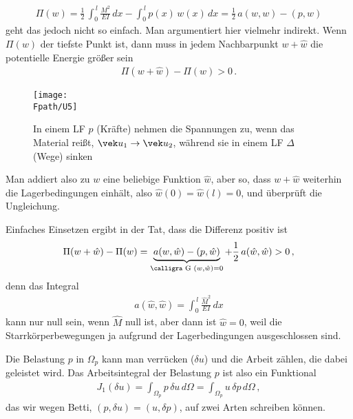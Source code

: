 {{{{{{\begin{align}
\Pi(w) =\frac{1}{2}\, \int_0^{\,l} \frac{M^2}{EI}\,dx - \int_0^{\,l} p(x)\,w(x)\,dx = \frac{1}{2}\, a(w,w) - (p,w)
\end{align}
 geht das jedoch nicht so einfach. Man argumentiert hier vielmehr indirekt. Wenn $\Pi(w) $ der tiefste Punkt ist, dann muss in jedem Nachbarpunkt $w + \hat{w}$ die potentielle Energie gr\"{o}{\ss}er sein
 \begin{align}
 \Pi(w + \hat{w}) - \Pi(w) > 0\,.
 \end{align}
\begin{figure}[tbp]
\centering
\if {} \sidecaption \fi
\texttt{[image: \\Fpath/U5]}
\caption{In einem LF $p$ (Kr\"{a}fte) nehmen die Spannungen zu, wenn das Material rei{\ss}t, $\vek u_1 \to \vek u_2$, w\"{a}hrend sie in einem LF $\Delta$ (Wege) sinken}
\label{U5}
\end{figure}%
 Man addiert also zu $w $ eine beliebige Funktion $\hat{w} $, aber so, dass $w + \hat{w}$ weiterhin die Lagerbedingungen einh\"{a}lt, also $\hat{w}(0) = \hat{w}(l) = 0$, und \"{u}berpr\"{u}ft die Ungleichung.

 Einfaches Einsetzen ergibt in der Tat, dass die Differenz positiv ist
 \begin{align} \label{Eq34}
 \Pi(w + \hat{w}) - \Pi(w) = \underbrace{a(w,\hat{w}) - (p,\hat{w})}_{\text{\normalfont\calligra G\,\,}(w,\hat{w}) = 0} + \frac{1}{2}\, a(\hat{w}, \hat{w}) > 0\,,
 \end{align}
 denn das Integral
 \begin{align}
 a(\hat{w}, \hat{w}) = \int_0^{\,l} \frac{\hat{M}^2}{EI}\,dx
 \end{align}
 kann nur null sein, wenn $\hat{M} $ null ist, aber dann ist $\hat{w} = 0$, weil die Starrk\"{o}rperbewegungen ja aufgrund der Lagerbedingungen ausgeschlossen sind.



Die Belastung $p$ in $\Omega_p$ kann man verr\"{u}cken ($\delta u$) und die Arbeit z\"{a}hlen, die dabei geleistet wird.  Das Arbeitsintegral der Belastung $p$ ist also ein Funktional
\begin{align}
J_1(\delta u) = \int_{\Omega_p} p\,\delta u\,d\Omega = \int_{\Omega_p} u\,\delta p\,d\Omega\,,
\end{align}
das wir wegen Betti, $(p, \delta u) = (u, \delta p)$, auf zwei Arten schreiben k\"{o}nnen.

}}}}}}
